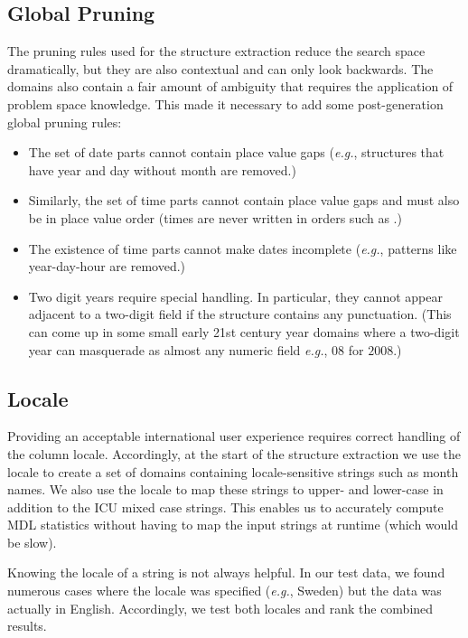 \subsection{Global Pruning}
The pruning rules used for the structure extraction reduce the search space dramatically, but they are also contextual and can only look backwards. 
The domains also contain a fair amount of ambiguity that requires the application of problem space knowledge. 
This made it necessary to add some post-generation global pruning rules:
\begin{itemize}
\setlength\itemsep{0em}
\item The set of date parts cannot contain place value gaps (\textit{e.g.}, structures that have year and day without month are removed.)
\item Similarly, the set of time parts cannot contain place value gaps and must also be in place value order (times are never written in orders such as .)
\item The existence of time parts cannot make dates incomplete (\textit{e.g.}, patterns like year-day-hour are removed.)
\item Two digit years require special handling. In particular, they cannot appear adjacent to a two-digit field if the structure contains any punctuation. (This can come up in some small early 21st century year domains where a two-digit year can masquerade as almost any numeric field \textit{e.g.}, $08$ for $2008$.)
\end{itemize}


\subsection{Locale}
Providing an acceptable international user experience requires correct handling of the column locale. 
Accordingly, at the start of the structure extraction we use the locale to create a set of domains containing locale-sensitive strings such as month names. We also use the locale to map these strings to upper- and lower-case in addition to the ICU mixed case strings. 
This enables us to accurately compute MDL statistics without having to map the input strings at runtime (which would be slow).

Knowing the locale of a string is not always helpful. In our test data, we found numerous cases where the locale was specified (\textit{e.g.}, Sweden) but the data was actually in English. Accordingly, we test both locales and rank the combined results. 

